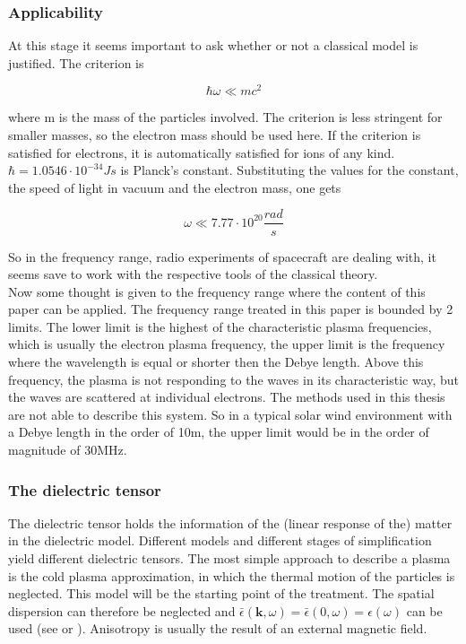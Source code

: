 \documentclass[two-column,ras]{agutex}
\begin{document}
\begin{article}
\subsubsection{Applicability}
At this stage it seems important to ask whether or not a classical model is justified. The criterion is

\begin{equation}
    \hbar \omega \ll m c^2
\end{equation}

where m is the mass of the particles involved. The criterion is less stringent for smaller masses, so the electron mass should be used here. If the criterion is satisfied for electrons, it is automatically satisfied for ions of any kind. $\hbar=1.0546 \cdot 10^{-34} Js $ is Planck's constant. Substituting the values for the constant, the speed of light in vacuum and the electron mass, one gets

\begin{equation}
    \omega \ll 7.77 \cdot 10^{20} \frac{rad}{s}
\end{equation}

So in the frequency range, radio experiments of spacecraft are dealing with, it seems save to work with the respective tools of the classical theory.\\

Now some thought is given to the frequency range where the content of this paper can be applied. The frequency range treated in this paper is bounded by 2 limits. The lower limit is the highest of the characteristic plasma frequencies,
which is usually the electron plasma frequency, the upper limit is the frequency where the wavelength is equal or shorter then the Debye
length. Above this frequency, the plasma is not responding to the waves in its characteristic way, but the waves are scattered at individual electrons. The methods used in this thesis are not able to describe this system. So in a typical solar wind environment with a Debye length in the order of 10m, the upper limit would be in the order of magnitude of 30MHz.


\subsubsection{The dielectric tensor}
The dielectric tensor holds the information of the (linear response of the) matter in the dielectric model. Different models and different stages of simplification yield different dielectric tensors. The most simple approach to describe a plasma is the cold plasma approximation, in which the thermal motion of the particles is neglected. This model will be the starting point of the treatment. The spatial dispersion can therefore be neglected and $\bar{\epsilon}(\mathbf{k},\omega)=\bar{\epsilon}(0,\omega)=\epsilon(\omega)$ can be used (see \cite{ginzburg} or \cite{stix}). Anisotropy is usually the result of an external magnetic field.\\


\end{article}
\end{document}
